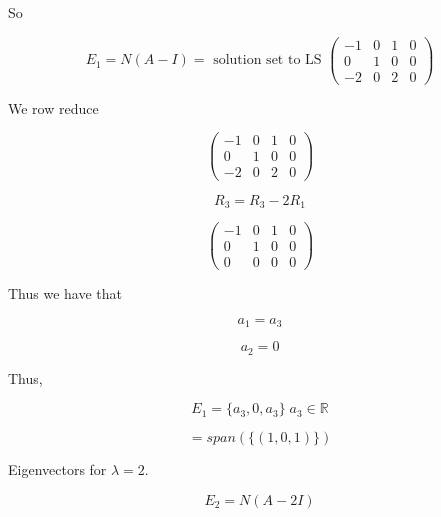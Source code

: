 \documentclass{article}
\newtheorem{one minute paper}[theorem]{One Minute Paper}
\begin{document}
So 

\begin{equation}
    E_1 = N(A - I) = \text{ solution set to LS }\left(\begin{array}{ccc|c}
        -1 & 0 & 1 & 0\\
        0 & 1 & 0 & 0 \\
        -2 & 0 & 2 & 0
    \end{array}\right)
\end{equation}

We row reduce

\begin{equation}
    \left(\begin{array}{ccc|c}
        -1 & 0 & 1 & 0\\
        0 & 1 & 0 & 0 \\
        -2 & 0 & 2 & 0
    \end{array}\right)
\end{equation}

\begin{equation}
    R_3 = R_3 - 2R_1
\end{equation}

\begin{equation}
    \left(\begin{array}{ccc|c}
        -1 & 0 & 1 & 0\\
        0 & 1 & 0 & 0 \\
        0 & 0 & 0 & 0
    \end{array}\right)
\end{equation}

Thus we have that 

\begin{equation}
    a_1 = a_3
\end{equation}

\begin{equation}
    a_2 = 0
\end{equation}

Thus, 

\begin{equation}
    E_1 = \{a_3, 0, a_3\} \; a_3 \in \mathbb{R}
\end{equation}

\begin{equation}
    = span(\{(1,0,1)\})
\end{equation}

Eigenvectors for $\lambda = 2$. 

\begin{equation}
    E_2 = N(A - 2I)
\end{equation}
\end{document}
